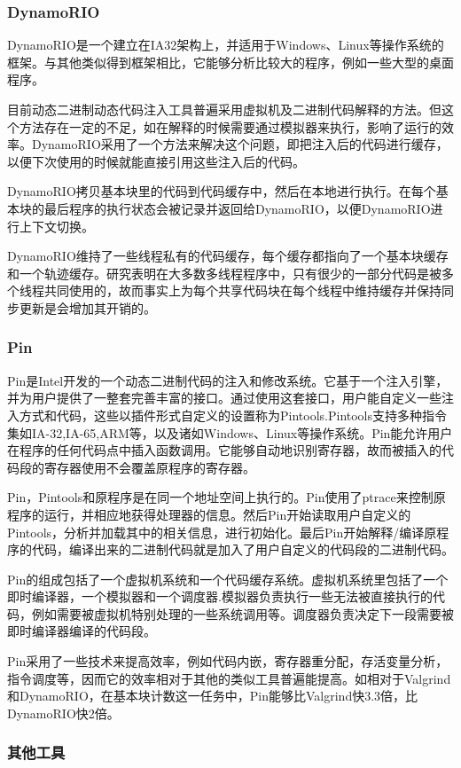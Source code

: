 \subsubsection{DynamoRIO}

DynamoRIO是一个建立在IA32架构上，并适用于Windows、Linux等操作系统的框架。与其他类似得到框架相比，它能够分析比较大的程序，例如一些大型的桌面程序。

目前动态二进制动态代码注入工具普遍采用虚拟机及二进制代码解释的方法。但这个方法存在一定的不足，如在解释的时候需要通过模拟器来执行，影响了运行的效率。DynamoRIO采用了一个方法来解决这个问题，即把注入后的代码进行缓存，以便下次使用的时候就能直接引用这些注入后的代码。

DynamoRIO拷贝基本块里的代码到代码缓存中，然后在本地进行执行。在每个基本块的最后程序的执行状态会被记录并返回给DynamoRIO，以便DynamoRIO进行上下文切换。

DynamoRIO维持了一些线程私有的代码缓存，每个缓存都指向了一个基本块缓存和一个轨迹缓存。研究表明在大多数多线程程序中，只有很少的一部分代码是被多个线程共同使用的，故而事实上为每个共享代码块在每个线程中维持缓存并保持同步更新是会增加其开销的。

\subsubsection{Pin}

Pin\cite{pin}是Intel开发的一个动态二进制代码的注入和修改系统。它基于一个注入引擎，并为用户提供了一整套完善丰富的接口。通过使用这套接口，用户能自定义一些注入方式和代码，这些以插件形式自定义的设置称为Pintools.Pintools支持多种指令集如IA-32,IA-65,ARM等，以及诸如Windows、Linux等操作系统。Pin能允许用户在程序的任何代码点中插入函数调用。它能够自动地识别寄存器，故而被插入的代码段的寄存器使用不会覆盖原程序的寄存器。

Pin，Pintools和原程序是在同一个地址空间上执行的。Pin使用了ptrace来控制原程序的运行，并相应地获得处理器的信息。然后Pin开始读取用户自定义的Pintools，分析并加载其中的相关信息，进行初始化。最后Pin开始解释/编译原程序的代码，编译出来的二进制代码就是加入了用户自定义的代码段的二进制代码。

Pin的组成包括了一个虚拟机系统和一个代码缓存系统。虚拟机系统里包括了一个即时编译器，一个模拟器和一个调度器.模拟器负责执行一些无法被直接执行的代码，例如需要被虚拟机特别处理的一些系统调用等。调度器负责决定下一段需要被即时编译器编译的代码段。

Pin采用了一些技术来提高效率，例如代码内嵌，寄存器重分配，存活变量分析，指令调度等，因而它的效率相对于其他的类似工具普遍能提高。如相对于Valgrind和DynamoRIO，在基本块计数这一任务中，Pin能够比Valgrind快3.3倍，比DynamoRIO快2倍。

\subsubsection{其他工具}
